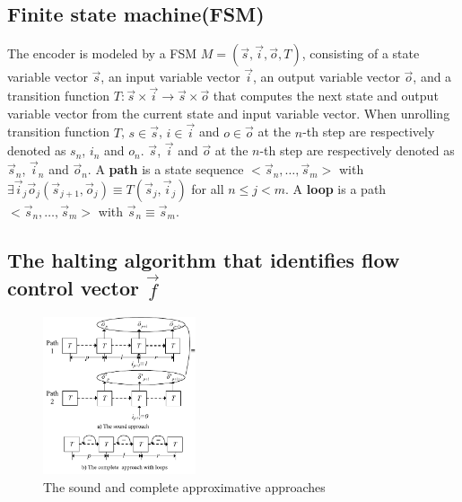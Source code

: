 \documentclass[conference]{IEEEtran}
\begin{document}
\subsection{Finite state machine(FSM)}\label{subsec_fsm}



The encoder is modeled by a FSM $M=(\vec{s},\vec{i},\vec{o},T)$,
consisting of a state variable vector $\vec{s}$,
an input variable vector $\vec{i}$,
an output variable vector $\vec{o}$,
and a transition function $T: \vec{s}\times \vec{i}\to \vec{s}\times \vec{o}$ 
that computes the next state and output variable vector from the current state and input variable vector.
When unrolling transition function $T$,
$s\in\vec{s}$,  $i\in\vec{i}$ and  $o\in\vec{o}$ at the $n$-th step 
are respectively denoted as $s_n$, $i_n$ and $o_n$.
$\vec{s}$, $\vec{i}$ and $\vec{o}$ at the $n$-th step are respectively denoted as $\vec{s}_n$, $\vec{i}_n$ and $\vec{o}_n$.
A \textbf{path} is a state sequence $<\vec{s}_n,\dots,\vec{s}_m>$ with $\exists \vec{i}_j\vec{o}_j (\vec{s}_{j+1},\vec{o}_j)\equiv T(\vec{s}_j,\vec{i}_j)$ for all $n\le j< m$.
A \textbf{loop} is a path $<\vec{s}_n,\dots,\vec{s}_m>$ with $\vec{s}_n\equiv \vec{s}_m$.



\subsection{The halting algorithm that identifies flow control vector $\vec{f}$}\label{subsec_chkextdec}

\begin{figure}[t]
\begin{center}
\includegraphics[width=0.4\textwidth]{pc}
\end{center}
\caption{The sound and complete approximative approaches}
  \label{fig_pc}
\end{figure}
\end{document}
